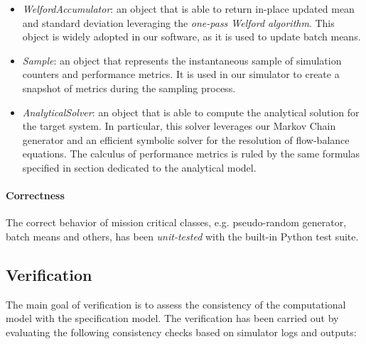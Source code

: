 \begin{itemize}
	\item \textit{WelfordAccumulator}: an object that is able to return in-place updated mean and standard deviation leveraging the \textit{one-pass Welford algorithm}. This object is widely adopted in our software, as it is used to update batch means.
	
	\item \textit{Sample}: an object that represents the instantaneous sample of simulation counters and performance metrics. It is used in our simulator to create a snapshot of metrics during the sampling process.
	
	\item \textit{AnalyticalSolver}: an object that is able to compute the analytical solution for the target system. In particular, this solver leverages our Markov Chain generator and an efficient symbolic solver for the resolution of flow-balance equations. The calculus of performance metrics is ruled by the same formulas specified in section dedicated to the analytical model.
\end{itemize}

\paragraph{Correctness}
The correct behavior of mission critical classes, e.g. pseudo-random generator, batch means and others, has been \textit{unit-tested} with the built-in Python test suite.


\subsection{Verification}
The main goal of verification is to assess the consistency of the computational model with the specification model.
The verification has been carried out by evaluating the following consistency checks based on simulator logs and outputs:

